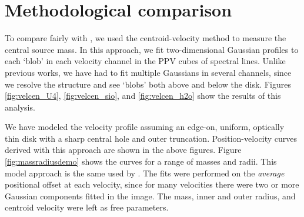 \documentclass[twocolumn]{aastex61}
\begin{document}


\appendix


\section{Methodological comparison}
\label{appendix:centroids}
To compare fairly with \citet{Plambeck2016a}, we  used the centroid-velocity
method to measure the central source mass.  In this approach, we fit
two-dimensional Gaussian
profiles to each `blob' in each velocity channel in the PPV cubes of spectral
lines.  Unlike previous works, we have had to fit multiple Gaussians in several
channels, since we resolve the structure and see `blobs' both above and below
the disk.
Figures \ref{fig:velcen_U4}, \ref{fig:velcen_sio}, and \ref{fig:velcen_h2o}
show the results of this analysis.



We have modeled the velocity profile assuming an edge-on, uniform, optically
thin disk with a sharp central hole and outer truncation.  
Position-velocity curves derived with this approach are shown in the above
figures. Figure \ref{fig:massradiusdemo}
shows the curves for a range of masses and radii.
This model approach is the same used by
\citet{Plambeck2016a}.
The fits were performed on the \emph{average} positional offset at each
velocity, since for many velocities there were two or more Gaussian
components fitted in the image.  The mass, inner and outer radius, and
centroid velocity were left as free parameters.
\end{document}
